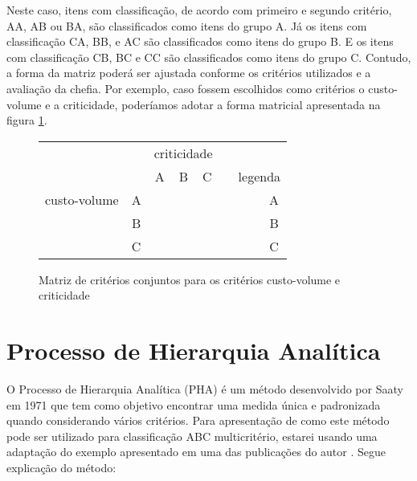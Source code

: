 \documentclass{book}
\begin{document}
Neste caso, itens com classificação, de acordo com primeiro e segundo critério, AA, AB ou BA, são classificados como itens do grupo A. Já os itens com classificação CA, BB, e AC são classificados como itens do grupo B. E os itens com classificação CB, BC e CC são classificados como itens do grupo C. Contudo, a forma da matriz poderá ser ajustada conforme os critérios utilizados e a avaliação da chefia. Por exemplo, caso fossem escolhidos como critérios o custo-volume e a criticidade, poderíamos adotar a forma matricial apresentada na figura \ref{fig:anotherJointMatrix}.

\begin{figure}[h]
\begin{center}
\begin{tabular}[c]{c c | c | c | c | c c c c}
&\multicolumn{1}{c}{}  & \multicolumn{3}{c}{criticidade} \\ 
 \multirow{3}{*}{\begin{turn}{90} custo-volume \end{turn}} & \multicolumn{1}{c}{} &\multicolumn{1}{c}{A} &\multicolumn{1}{c}{B} & \multicolumn{1}{c}{C} & & \multicolumn{3}{c}{legenda} \\
\cline {3-5}
& A & \cellcolor{green} & \cellcolor{green} & \multicolumn{1}{|b|}{} & &  & \cellcolor{green} & A \\ 
\cline {3-5}
& B & \cellcolor{green} &  \multicolumn{1}{|b|}{} & \cellcolor{yellow}  & & & \cellcolor{blue} & B \\
\cline {3-5}
& C & \cellcolor{green} &  \cellcolor{blue} & \cellcolor{yellow} & & & \cellcolor{yellow} & C\\ 
\end{tabular}
\end{center}
\caption{Matriz de critérios conjuntos para os critérios custo-volume e criticidade}
\label{fig:anotherJointMatrix}
\end{figure}

\section{Processo de Hierarquia Analítica}
\label{sec:hierarquiaAnalitica}

O Processo de Hierarquia Analítica (PHA) é um método desenvolvido por Saaty em 1971 que tem como objetivo encontrar uma medida única e padronizada quando considerando vários critérios. Para apresentação de como este método pode ser utilizado para classificação ABC multicritério, estarei usando uma adaptação do exemplo apresentado em uma das publicações do autor \citep{Saaty1987}. Segue explicação do método:
\end{document}
